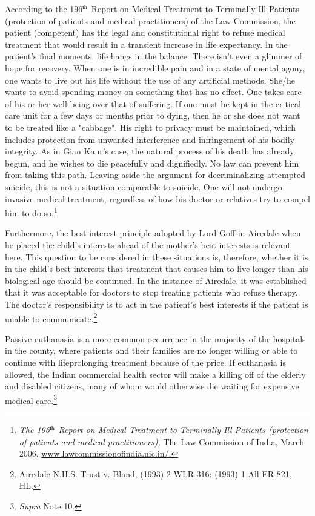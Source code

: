 \begin{multicols}{2}
\noi
According to the 196$^{\rm th}$ Report on Medical Treatment to Terminally Ill Patients (protection of
patients and medical practitioners) of the Law Commission, the patient (competent) has the
legal and constitutional right to refuse medical treatment that would result in a transient
increase in life expectancy. In the patient's final moments, life hangs in the balance. There
isn't even a glimmer of hope for recovery. When one is in incredible pain and in a state of
mental agony, one wants to live out his life without the use of any artificial methods. She/he
wants to avoid spending money on something that has no effect. One takes care of his or her
well-being over that of suffering. If one must be kept in the critical care unit for a few days or
months prior to dying, then he or she does not want to be treated like a "cabbage". His right
to privacy must be maintained, which includes protection from unwanted interference and
infringement of his bodily integrity. As in Gian Kaur's case, the natural process of his death
has already begun, and he wishes to die peacefully and dignifiedly. No law can prevent him
from taking this path. Leaving aside the argument for decriminalizing attempted suicide, this
is not a situation comparable to suicide. One will not undergo invasive medical treatment,
regardless of how his doctor or relatives try to compel him to do so.\footnote{\textit{The 196$^{\rm th}$ Report on Medical Treatment to Terminally Ill Patients (protection of patients and medical
practitioners),} The Law Commission of India, March 2006, \url{www.lawcommissionofindia.nic.in/.}}

\noi
Furthermore, the best interest principle adopted by Lord Goff in Airedale when he placed the
child's interests ahead of the mother's best interests is relevant here. This question to be
considered in these situations is, therefore, whether it is in the child's best interests that 
treatment that causes him to live longer than his biological age should be continued. In the
instance of Airedale, it was established that it was acceptable for doctors to stop treating
patients who refuse therapy. The doctor's responsibility is to act in the patient's best interests
if the patient is unable to communicate.\footnote{Airedale N.H.S. Trust v. Bland, (1993) 2 WLR 316: (1993) 1 All ER 821, HL.}


\noi
Passive euthanasia is a more common occurrence in the majority of the hospitals in the
county, where patients and their families are no longer willing or able to continue with lifeprolonging treatment because of the price. If euthanasia is allowed, the Indian commercial health sector will make a killing off of the elderly and disabled citizens, many of whom would otherwise die waiting for expensive medical care.\footnote{\textit{Supra} Note 10.}


\end{multicols}
